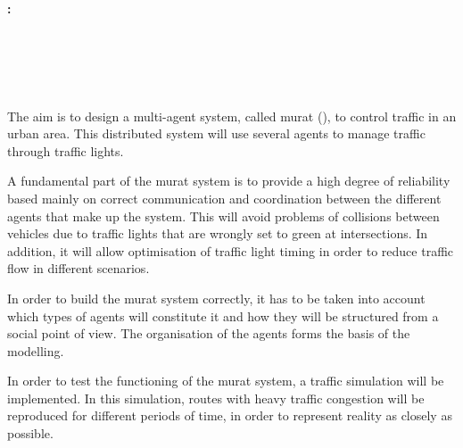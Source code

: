 \cleardoublepage

\chapter*{}

\thispagestyle{empty}

\begin{center}
    {\large\bfseries \myTitleShort: \myTitle}\\
\end{center}

\begin{center}
    \myName\\
\end{center}

\\

    \vspace{0.7cm}

\\

The aim is to design a multi-agent system, called \acrshort{murat} (\myTitle), to control traffic in an urban area. This distributed system will use several agents to manage traffic through traffic lights.

A fundamental part of the \acrshort{murat} system is to provide a high degree of reliability based mainly on correct communication and coordination between the different agents that make up the system. This will avoid problems of collisions between vehicles due to traffic lights that are wrongly set to green at intersections. In addition, it will allow optimisation of traffic light timing in order to reduce traffic flow in different scenarios. 

In order to build the \acrshort{murat} system correctly, it has to be taken into account which types of agents will constitute it and how they will be structured from a social point of view. The organisation of the agents forms the basis of the modelling.

In order to test the functioning of the \acrshort{murat} system, a traffic simulation will be implemented. In this simulation, routes with heavy traffic congestion will be reproduced for different periods of time, in order to represent reality as closely as possible.
